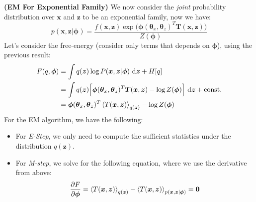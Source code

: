 \begin{definition}{\textbf{(EM For Exponential Family)}}
    We now consider the \emph{joint} probability distribution over $\boldsymbol x$ and $\boldsymbol z$ to be an exponential family, now we have:
    \begin{equation*}
        p(\boldsymbol x, \boldsymbol z | \boldsymbol \phi) = \frac{f(\boldsymbol x, \boldsymbol z) \exp\Big(\boldsymbol \phi(\boldsymbol \theta_x, \boldsymbol \theta_z)^T\boldsymbol T(\boldsymbol x, \boldsymbol z)\Big) }{Z(\boldsymbol \phi)}
    \end{equation*}
    Let's consider the free-energy (consider only terms that depends on $\boldsymbol \phi$), using the previous result:
    \begin{equation*}
    \begin{aligned}
        F(q, \boldsymbol \phi) &= \int q(\boldsymbol z) \log P(\boldsymbol x, \boldsymbol z | \boldsymbol \phi) \ \mathrm{d} \boldsymbol z + H[q] \\
        &= \int q(\boldsymbol z) \Big[ \boldsymbol \phi(\boldsymbol \theta_x, \boldsymbol \theta_z) ^T\boldsymbol T(\boldsymbol x, \boldsymbol z) - \log Z(\boldsymbol \phi) \Big]\ \mathrm{d} \boldsymbol z + \text{const.} \\
        &=  \boldsymbol\phi(\boldsymbol \theta_x, \boldsymbol \theta_z)^T\left\langle T(\boldsymbol x, \boldsymbol z) \right\rangle_{q(\boldsymbol z)} - \log Z(\boldsymbol \phi) \\
    \end{aligned}
    \end{equation*}
    For the EM algorithm, we have the following:
    \begin{itemize}
        \item For \emph{E-Step}, we only need to compute the sufficient statistics under the distribution $q(\boldsymbol z)$. 
        \item For \emph{M-step}, we solve for the following equation, where we use the derivative from above:
        \begin{equation*}
            \frac{\partial F}{\partial \boldsymbol \phi} = \left\langle T(\boldsymbol x, \boldsymbol z) \right\rangle_{q(\boldsymbol z)} - \left\langle T(\boldsymbol x, \boldsymbol z) \right\rangle_{p(\boldsymbol x, \boldsymbol z | \boldsymbol \phi)} =\boldsymbol 0
        \end{equation*}
    \end{itemize}
\end{definition}

